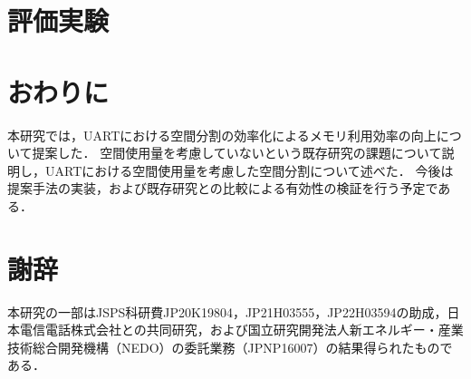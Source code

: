 \chapter{評価実験}






\chapter{おわりに}

本研究では，UARTにおける空間分割の効率化によるメモリ利用効率の向上について提案した．
空間使用量を考慮していないという既存研究の課題について説明し，UARTにおける空間使用量を考慮した空間分割について述べた．
今後は提案手法の実装，および既存研究との比較による有効性の検証を行う予定である．





\chapter*{謝辞}

本研究の一部はJSPS科研費JP20K19804，JP21H03555，JP22H03594の助成，日本電信電話株式会社との共同研究，および国立研究開発法人新エネルギー・産業技術総合開発機構（NEDO）の委託業務（JPNP16007）の結果得られたものである．